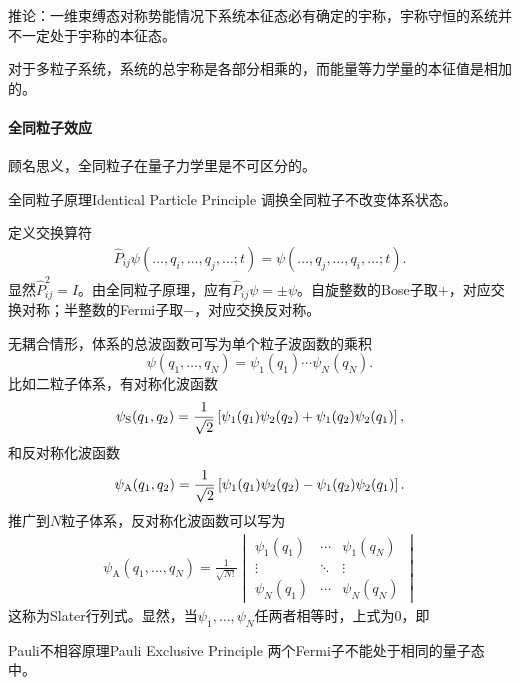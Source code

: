 推论：一维束缚态对称势能情况下系统本征态必有确定的宇称，宇称守恒的系统并不一定处于宇称的本征态。

对于多粒子系统，系统的总宇称是各部分相乘的，而能量等力学量的本征值是相加的。
\paragraph{全同粒子效应}顾名思义，全同粒子在量子力学里是不可区分的。
\begin{theorem}{全同粒子原理}{Identical Particle Principle}
	调换全同粒子不改变体系状态。
\end{theorem}
定义交换算符
\begin{align}
	\hat P_{ij}\psi(\ldots,q_i,\ldots,q_j,\ldots;t)=\psi(\ldots,q_j,\ldots,q_i,\ldots;t).
\end{align}
显然$\hat P_{ij}^2=I$。由全同粒子原理，应有$\hat P_{ij}\psi=\pm\psi$。自旋整数的Bose子取$+$，对应交换对称；半整数的Fermi子取$-$，对应交换反对称。

无耦合情形，体系的总波函数可写为单个粒子波函数的乘积
\[
	\psi(q_1,\ldots,q_N)=\psi_1(q_1)\cdots\psi_N(q_N).
\]
比如二粒子体系，有对称化波函数
\[
	\psi_\mathrm S(q_1,q_2)=\frac1{\sqrt2}\left[\psi_1(q_1)\psi_2(q_2)+\psi_1(q_2)\psi_2(q_1)\right],
\]
和反对称化波函数
\[
	\psi_\mathrm A(q_1,q_2)=\frac1{\sqrt2}\left[\psi_1(q_1)\psi_2(q_2)-\psi_1(q_2)\psi_2(q_1)\right].
\]
推广到$N$粒子体系，反对称化波函数可以写为
\begin{align}
	\psi_\mathrm A(q_1,\ldots,q_N)=\frac1{\sqrt{N!}}\begin{vmatrix}
		\psi_1(q_1)&\cdots&\psi_1(q_N)\\
		\vdots&\ddots&\vdots\\
		\psi_N(q_1)&\cdots&\psi_N(q_N)
	\end{vmatrix}
\end{align}
这称为Slater行列式。显然，当$\psi_1,\ldots,\psi_N$任两者相等时，上式为0，即
\begin{theorem}{Pauli不相容原理}{Pauli Exclusive Principle}
	两个Fermi子不能处于相同的量子态中。
\end{theorem}